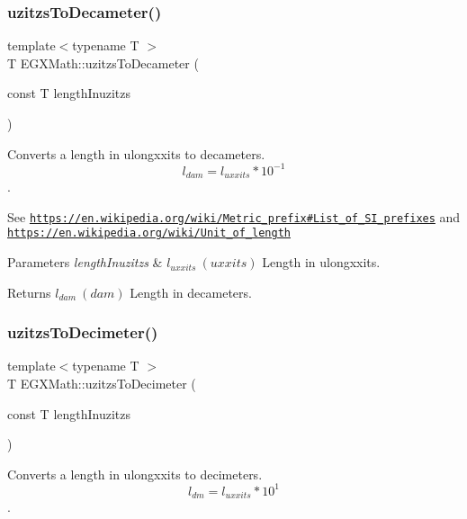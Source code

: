 \subsubsection{\texorpdfstring{uzitzs\+To\+Decameter()}{uzitzsToDecameter()}}
{\footnotesize\ttfamily template$<$typename T $>$ \\
T E\+G\+X\+Math\+::uzitzs\+To\+Decameter (\begin{DoxyParamCaption}\item[{const T}]{length\+Inuzitzs }\end{DoxyParamCaption})}



Converts a length in ulongxxits to decameters. \[ l_{dam}=l_{uxxits} * 10^{-1} \]. 

See \href{https://en.wikipedia.org/wiki/Metric_prefix#List_of_SI_prefixes}{\tt https\+://en.\+wikipedia.\+org/wiki/\+Metric\+\_\+prefix\#\+List\+\_\+of\+\_\+\+S\+I\+\_\+prefixes} and \href{https://en.wikipedia.org/wiki/Unit_of_length}{\tt https\+://en.\+wikipedia.\+org/wiki/\+Unit\+\_\+of\+\_\+length} 
\begin{DoxyParams}{Parameters}
{\em length\+Inuzitzs} & $ l_{uxxits}\ (uxxits)$ Length in ulongxxits. \\
\hline
\end{DoxyParams}
\begin{DoxyReturn}{Returns}
$ l_{dam}\ (dam)$ Length in decameters. 
\end{DoxyReturn}
\mbox{\label{group___e_g_x_math-_conversions-_length_conversions-uzitzs-_s_i_ga178324834750df4df1026a8900fadbcc}} 
\subsubsection{\texorpdfstring{uzitzs\+To\+Decimeter()}{uzitzsToDecimeter()}}
{\footnotesize\ttfamily template$<$typename T $>$ \\
T E\+G\+X\+Math\+::uzitzs\+To\+Decimeter (\begin{DoxyParamCaption}\item[{const T}]{length\+Inuzitzs }\end{DoxyParamCaption})}



Converts a length in ulongxxits to decimeters. \[ l_{dm}=l_{uxxits} * 10^{1} \]. 

